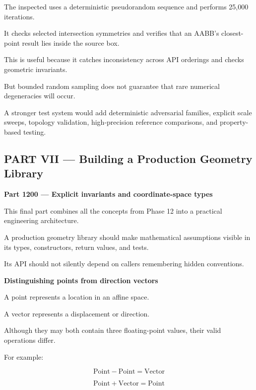 The inspected  uses a deterministic pseudorandom sequence and performs 25,000 iterations.

It checks selected intersection symmetries and verifies that an AABB's closest-point result lies inside the source box.

This is useful because it catches inconsistency across API orderings and checks geometric invariants.

But bounded random sampling does not guarantee that rare numerical degeneracies will occur.

A stronger test system would add deterministic adversarial families, explicit scale sweeps, topology validation, high-precision reference comparisons, and property-based testing.

\subsection{PART VII --- Building a Production Geometry Library}\label{04-visual-computing-ii-ch023-part-vii-building-a-production-geometry-library}

\hypertarget{04-visual-computing-ii-ch023-part-vii-building-a-production-geometry-library}{}

\textbf{Part 1200 --- Explicit invariants and coordinate-space types}

This final part combines all the concepts from Phase 12 into a practical engineering architecture.

A production geometry library should make mathematical assumptions visible in its types, constructors, return values, and tests.

Its API should not silently depend on callers remembering hidden conventions.

\textbf{Distinguishing points from direction vectors}

A point represents a location in an affine space.

A vector represents a displacement or direction.

Although they may both contain three floating-point values, their valid operations differ.

For example:

\[
\text{Point}-\text{Point}=\text{Vector}
\]

\[
\text{Point}+\text{Vector}=\text{Point}
\]

